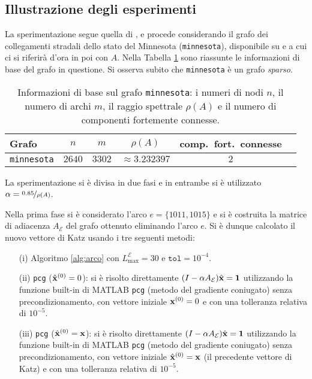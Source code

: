 \documentclass[a4paper]{article}
\newcommand{\xvec}{{\bf x}}
\newcommand{\bone}{\mathbf{1}}
\newcommand{\cE}{\mathcal{E}}
\begin{document}
	\subsection{Illustrazione degli esperimenti}
	
	La sperimentazione segue quella di \cite[Section 7]{katz2024}, e procede considerando il grafo dei collegamenti stradali dello
	stato del Minnesota (\texttt{minnesota}), disponibile su \cite{minnesota} e a cui ci si riferirà d'ora in poi con $A$. Nella Tabella \ref{tab:info_minnesota} sono riassunte
	le informazioni di base del grafo in questione. Si osserva subito che \texttt{minnesota} è un grafo \textit{sparso}.
	
	\begin{table}[H]
		\centering
		\caption{Informazioni di base sul grafo \texttt{minnesota}: i numeri di nodi $n$, il numero di archi $m$, il raggio spettrale $\rho(A)$ e il numero di componenti fortemente connesse.}
		\label{tab:info_minnesota}
		
		\vskip 0.1in
		    
		\begin{tabular}{|l|c|c|c|c|c|}       
			\hline
			Grafo              & $n$  & $m$  & $\rho(A)$ & comp.~fort.~connesse \\
			\hline
			\texttt{minnesota} & $2640$ & $3302$ & $\approx 3.232397$  & $2$                    \\
			\hline
		\end{tabular}    
	\end{table}
	
	La sperimentazione si è divisa in due fasi e in entrambe si è utilizzato $\alpha = \nicefrac{0.85}{\rho(A)}$.
	
	Nella prima fase si è considerato l'arco $e = \{1011, 1015\}$ e si è costruita la
	matrice di adiacenza $A_\cE$ del grafo ottenuto eliminando l'arco $e$. Si è dunque calcolato il nuovo vettore di Katz
	usando i tre seguenti metodi:
	
	\begin{enumerate}
		\item[(i)] Algoritmo \ref{alg:arco} con $L_{\max}^{\cE} = 30$ e $\texttt{tol} = 10^{-4}$.
		\item[(ii)] \texttt{pcg} ($\hat\xvec^{(0)} = 0$): si è risolto direttamente $(I - \alpha A_\cE) \hat\xvec = \bone$ utilizzando
		      la funzione built-in di MATLAB \texttt{pcg} (metodo del gradiente coniugato) senza precondizionamento, con vettore iniziale
		      $\xvec^{(0)} = 0$ e con una tolleranza relativa di $10^{-5}$.
		\item[(iii)] \texttt{pcg} ($\hat\xvec^{(0)} = \xvec$): si è risolto direttamente $(I - \alpha A_\cE) \hat\xvec = \bone$ utilizzando
		      la funzione built-in di MATLAB \texttt{pcg} (metodo del gradiente coniugato) senza precondizionamento, con vettore iniziale
		      $\hat\xvec^{(0)} = \xvec$ (il precedente vettore di Katz) e con una tolleranza relativa di $10^{-5}$.
	\end{enumerate}
	
\end{document}
